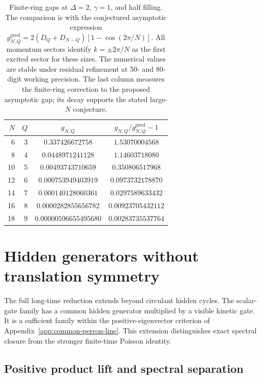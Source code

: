 \documentclass[aps,pre,reprint,amsmath,amssymb,longbibliography,floatfix]{revtex4-2}
\begin{document}
\begin{table}[!tbp]
\caption{Finite-ring gaps at $\Delta=2$, $\gamma=1$, and half filling.
The comparison is with the conjectured asymptotic expression
$g^{\mathrm{pred}}_{N,Q}=2(D_Q+D_{N-Q})\left[1-\cos(2\pi/N)\right]$.
All momentum sectors identify $k=\pm2\pi/N$ as the first excited sector
for these sizes. The numerical values are stable under residual refinement at
50- and 80-digit working precision. The last column measures the finite-ring correction to the proposed
asymptotic gap; its decay supports the stated large-$N$ conjecture.}

\label{tab:droplet-gaps}
\begin{ruledtabular}
\begin{tabular}{rrcc}
$N$ & $Q$ & $g_{N,Q}$ & $g_{N,Q}/g^{\mathrm{pred}}_{N,Q}-1$\\

\hline
6 & 3 & $0.337426672758$ & $1.53070004568$\\
8 & 4 & $0.0448971241128$ & $1.14603718080$\\
10 & 5 & $0.00493743710659$ & $0.350806517968$\\
12 & 6 & $0.000753949403919$ & $0.0973732178870$\\
14 & 7 & $0.000140128060361$ & $0.0297589633432$\\
16 & 8 & $0.0000282855656782$ & $0.00923705432112$\\
18 & 9 & $0.00000596655495680$ & $0.00283735537764$
\end{tabular}
\end{ruledtabular}
\end{table}

\section{Hidden generators without translation symmetry}
\label{app:general-hidden}

The full long-time reduction extends beyond circulant hidden cycles.
The scalar-gate family has a common hidden generator multiplied by a
visible kinetic gate. It is a sufficient family within the positive-eigenvector
criterion of Appendix~\ref{app:common-perron-line}. This extension distinguishes exact spectral closure
from the stronger finite-time Poisson identity.

\subsection{Positive product lift and spectral separation}
\label{app:hidden-positive-lift}
\end{document}
